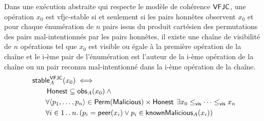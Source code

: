 

\begin{theorem}\label{th:vfjc-stable}
Dans une exécution abstraite qui respecte le modèle de cohérence $\operatorname{\mathsf{VFJC}}$, une opération $x_0$ est vfjc-stable si et seulement si les pairs honnêtes observent $x_0$ et pour chaque énumération de $n$ pairs issus du produit cartésien des permutations des pairs mal-intentionnés par les pairs honnêtes, il existe une chaîne de visibilité de $n$ opérations tel que $x_0$ est visible ou égale à la première opération de la chaîne et le i-ème pair de l'énumération est l'auteur de la i-ème opération de la chaîne ou un pair reconnu mal-intentionné dans la i-ème opération de la chaîne.
\begin{equation*}\begin{split}
\MoveEqLeft\trm{stable}_A^{\trm{VFJC}}(x_0) \iff \\
    &\trm{Honest} \subseteq \trm{obs}_A(x_0) \:\land \\
    &\forall \tuple*{p_1,\dotsc, p_n} \in \trm{Perm}(\trm{Malicious}) \times \trm{Honest} \:\exists x_0 \viseq \dotsb \viseq x_n\\
    &\forall i \in \irange{1}{n} \qsep (p_i = \trm{peer}(x_i) \lor p_i \in \trm{knownMalicious}_A(x_i))
\end{split}\end{equation*}
\end{theorem}

